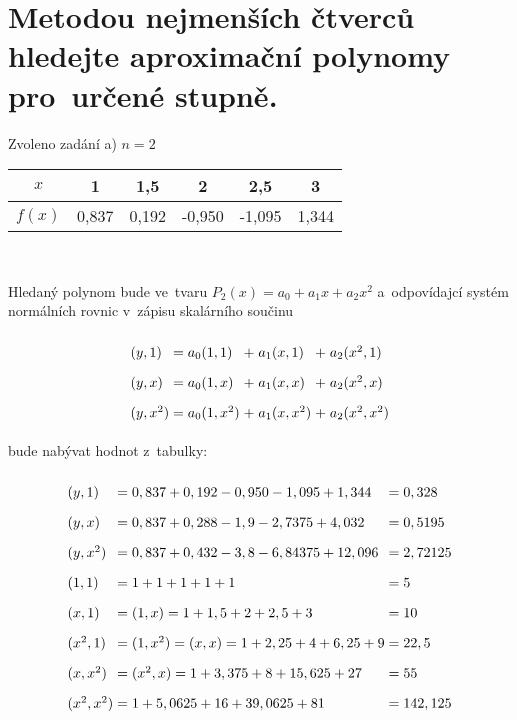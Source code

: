\documentclass[a4paper,10pt]{article}
\begin{document}
\newpage
\section{Metodou nejmenších čtverců hledejte aproximační polynomy pro~určené stupně.}

\par Zvoleno zadání a) $n=2$

\begin{center}
	\begin{tabular}{|c|c|c|c|c|c|}
		\hline
		$x$ & 1 & 1,5 & 2 & 2,5 & 3 \\
		\hline
		$f(x)$ & 0,837 & 0,192 & -0,950 & -1,095 & 1,344 \\
		\hline
	\end{tabular}
\end{center}

\par ~\\

\par Hledaný polynom bude ve~tvaru $P_2(x)=a_0+a_1x+a_2x^2$ a~odpovídajcí systém
normálních rovnic v~zápisu skalárního součinu

\begin{equation}
\arraycolsep=1.4pt\def\arraystretch{1.8}
\begin{array}{lclclcl}
\label{eq:norm}
(y,1) & = & a_0(1,1) & + & a_1(x,1) & + & a_2(x^2,1) \\
(y,x) & = & a_0(1,x) & + & a_1(x,x) & + & a_2(x^2,x) \\
(y,x^2) & = & a_0(1,x^2) & + & a_1(x,x^2) & + & a_2(x^2,x^2) \\
\end{array}
\end{equation}

bude nabývat hodnot z~tabulky:

\[\arraycolsep=1.4pt\def\arraystretch{1.8}
\begin{array}{lclcl}
(y,1) & = & 0,837 + 0,192 - 0,950 - 1,095 + 1,344 & = & 0,328 \\
(y,x) & = & 0,837 +  0,288 - 1,9 - 2,7375 + 4,032 & = & 0,5195 \\
(y,x^2) & = & 0,837 + 0,432 - 3,8 - 6,84375 + 12,096 & = & 2,72125 \\
(1,1) & = & 1 + 1 + 1 + 1 + 1 & = & 5 \\
(x,1) & = & (1,x) = 1 + 1,5 + 2 + 2,5 + 3 & = & 10 \\
(x^2,1) & = & (1,x^2) = (x,x) = 1 + 2,25 + 4 + 6,25 + 9 & = & 22,5 \\
(x,x^2) & = & (x^2,x) = 1 + 3,375 + 8 + 15,625 + 27 & = & 55 \\
(x^2,x^2) & = & 1 + 5,0625 + 16 + 39,0625 + 81 & = & 142,125 \\
\end{array}
\]
\end{document}
